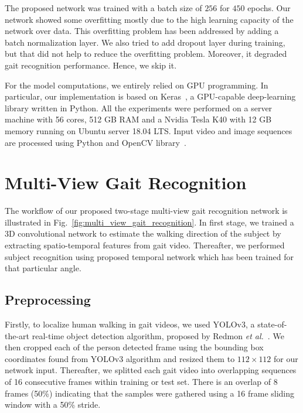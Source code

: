 The proposed network was trained with a batch size of $ 256 $ for $ 450 $ epochs. Our network showed some overfitting mostly due to the high learning capacity of the network over data. This overfitting problem has been addressed by adding a batch normalization layer. We also tried to add dropout layer during training, but that did not help to reduce the overfitting problem. Moreover, it degraded gait recognition performance. Hence, we skip it.

For the model computations, we entirely relied on GPU programming. In particular, our implementation is based on Keras~\cite{keras}, a GPU-capable deep-learning library written in Python. All the experiments were performed on a server machine with 56 cores, 512 GB RAM and a Nvidia Tesla K40 with 12 GB memory running on Ubuntu server 18.04 LTS. Input video and image sequences are processed using Python and OpenCV library~\cite{opencv}.





\section{Multi-View Gait Recognition}
The workflow of our proposed two-stage multi-view gait recognition network is illustrated in Fig.~\ref{fig:multi_view_gait_recognition}. In first stage, we trained a 3D convolutional network to estimate the walking direction of the subject by extracting spatio-temporal features from gait video. Thereafter, we performed subject recognition using proposed temporal network which has been trained for that particular angle.


\subsection{Preprocessing}
Firstly, to localize human walking in gait videos, we used YOLOv3, a state-of-the-art real-time object detection algorithm, proposed by Redmon \textit{et al.}~\cite{Redmon_18}. We then cropped each of the person detected frame using the bounding box coordinates found from YOLOv3 algorithm and resized them to $112\times112$ for our network input. Thereafter, we splitted each gait video into overlapping sequences of 16 consecutive frames within training or test set. There is an overlap of 8 frames (50\%) indicating that the samples were gathered using a 16 frame sliding window with a 50\% stride.


